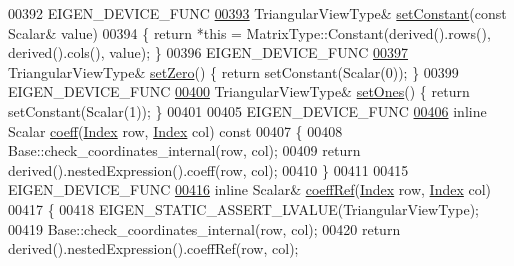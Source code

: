 \begin{DoxyCode}
00392     EIGEN\_DEVICE\_FUNC
\hyperlink{group___core___module_aae1460a593106b7e22fad56ce2c3c957}{00393}     TriangularViewType& \hyperlink{group___core___module_aae1460a593106b7e22fad56ce2c3c957}{setConstant}(\textcolor{keyword}{const} Scalar& value)
00394     \{ \textcolor{keywordflow}{return} *\textcolor{keyword}{this} = MatrixType::Constant(derived().rows(), derived().cols(), value); \}
00396     EIGEN\_DEVICE\_FUNC
\hyperlink{group___core___module_a27ea7bd66892206be3a0c7a1195fec14}{00397}     TriangularViewType& \hyperlink{group___core___module_a27ea7bd66892206be3a0c7a1195fec14}{setZero}() \{ \textcolor{keywordflow}{return} setConstant(Scalar(0)); \}
00399     EIGEN\_DEVICE\_FUNC
\hyperlink{group___core___module_a39d202f5efbf14179ca30435c9dc04b5}{00400}     TriangularViewType& \hyperlink{group___core___module_a39d202f5efbf14179ca30435c9dc04b5}{setOnes}() \{ \textcolor{keywordflow}{return} setConstant(Scalar(1)); \}
00401 
00405     EIGEN\_DEVICE\_FUNC
\hyperlink{group___core___module_a906168fa5121cfe301bc801df50807ad}{00406}     \textcolor{keyword}{inline} Scalar \hyperlink{group___core___module_a906168fa5121cfe301bc801df50807ad}{coeff}(\hyperlink{group___core___module_a554f30542cc2316add4b1ea0a492ff02}{Index} row, \hyperlink{group___core___module_a554f30542cc2316add4b1ea0a492ff02}{Index} col)\textcolor{keyword}{ const}
00407 \textcolor{keyword}{    }\{
00408       Base::check\_coordinates\_internal(row, col);
00409       \textcolor{keywordflow}{return} derived().nestedExpression().coeff(row, col);
00410     \}
00411 
00415     EIGEN\_DEVICE\_FUNC
\hyperlink{group___core___module_a451953e43fc2e9231f05e7926d0e9d98}{00416}     \textcolor{keyword}{inline} Scalar& \hyperlink{group___core___module_a451953e43fc2e9231f05e7926d0e9d98}{coeffRef}(\hyperlink{group___core___module_a554f30542cc2316add4b1ea0a492ff02}{Index} row, \hyperlink{group___core___module_a554f30542cc2316add4b1ea0a492ff02}{Index} col)
00417     \{
00418       EIGEN\_STATIC\_ASSERT\_LVALUE(TriangularViewType);
00419       Base::check\_coordinates\_internal(row, col);
00420       \textcolor{keywordflow}{return} derived().nestedExpression().coeffRef(row, col);

\end{DoxyCode}
